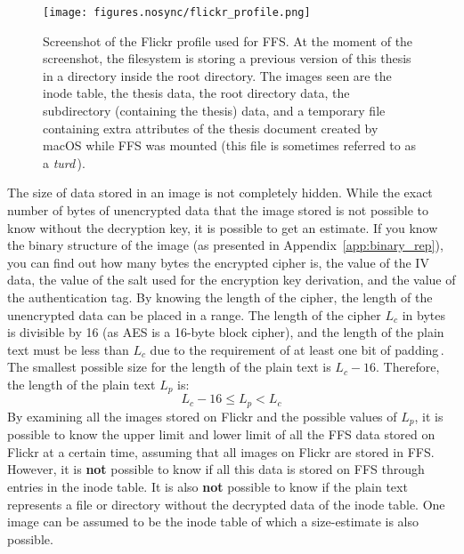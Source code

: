 \begin{figure}[!h]
	\begin{center}
	  \texttt{[image: figures.nosync/flickr\_profile.png]}
	\end{center}
	\caption[Screenshot of the Flickr profile used for \gls{FFS}]{Screenshot of the Flickr profile used for \gls{FFS}. At the moment of the screenshot, the filesystem is storing a previous version of this thesis in a directory inside the root directory. The images seen are the inode table, the thesis data, the root directory data, the subdirectory (containing the thesis) data, and a temporary file containing extra attributes of the thesis document created by macOS while \gls{FFS} was mounted (this file is sometimes referred to as a \textit{turd}\,\cite{geekosaurAnswerWhyAre2011}).}
	\label{fig:flickr_profile}
\end{figure}

The size of data stored in an image is not completely hidden. While the exact number of bytes of unencrypted data that the image stored is not possible to know without the decryption key, it is possible to get an estimate. If you know the binary structure of the image (as presented in Appendix~\ref{app:binary_rep}), you can find out how many bytes the encrypted cipher is, the value of the \gls{IV} data, the value of the salt used for the encryption key derivation, and the value of the authentication tag. By knowing the length of the cipher, the length of the unencrypted data can be placed in a range. The length of the cipher $L_c$ in bytes is divisible by 16 (as \gls{AES} is a \mbox{16-byte} block cipher), and the length of the plain text must be less than $L_c$ due to the requirement of at least one bit of padding\,\cite{z.z.coderAnswerSizeData2010}. The smallest possible size for the length of the plain text is $L_c - 16$. Therefore, the length of the plain text $L_p$ is:
$$
	L_c - 16 \leq L_p < L_c
$$
By examining all the images stored on Flickr and the possible values of $L_p$, it is possible to know the upper limit and lower limit of all the \gls{FFS} data stored on Flickr at a certain time, assuming that all images on Flickr are stored in \gls{FFS}. However, it is \textbf{not} possible to know if all this data is stored on \gls{FFS} through entries in the inode table. It is also \textbf{not} possible to know if the plain text represents a file or directory without the decrypted data of the inode table. One image can be assumed to be the inode table of which a \mbox{size-estimate} is also possible. 

